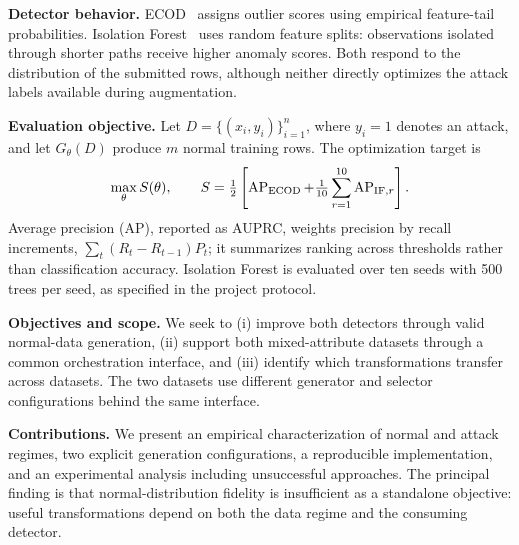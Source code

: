 \documentclass[10pt,a4paper]{article}
\begin{document}
\textbf{Detector behavior.} ECOD~\cite{ecod} assigns outlier scores using empirical feature-tail probabilities. Isolation Forest~\cite{iforest} uses random feature splits: observations isolated through shorter paths receive higher anomaly scores. Both respond to the distribution of the submitted rows, although neither directly optimizes the attack labels available during augmentation.

\textbf{Evaluation objective.} Let $D=\{(x_i,y_i)\}_{i=1}^{n}$, where $y_i=1$ denotes an attack, and let $G_\theta(D)$ produce $m$ normal training rows. The optimization target is
\begin{equation}
\max_\theta S(\theta),\qquad
S=\tfrac12\left[\operatorname{AP}_{\rm ECOD}+\tfrac1{10}\sum_{r=1}^{10}\operatorname{AP}_{{\rm IF},r}\right].
\end{equation}
Average precision (AP), reported as AUPRC, weights precision by recall increments, $\sum_t(R_t-R_{t-1})P_t$; it summarizes ranking across thresholds rather than classification accuracy. Isolation Forest is evaluated over ten seeds with 500 trees per seed, as specified in the project protocol.

\textbf{Objectives and scope.} We seek to (i) improve both detectors through valid normal-data generation, (ii) support both mixed-attribute datasets through a common orchestration interface, and (iii) identify which transformations transfer across datasets. The two datasets use different generator and selector configurations behind the same interface.

\textbf{Contributions.} We present an empirical characterization of normal and attack regimes, two explicit generation configurations, a reproducible implementation, and an experimental analysis including unsuccessful approaches. The principal finding is that normal-distribution fidelity is insufficient as a standalone objective: useful transformations depend on both the data regime and the consuming detector.
\end{document}
